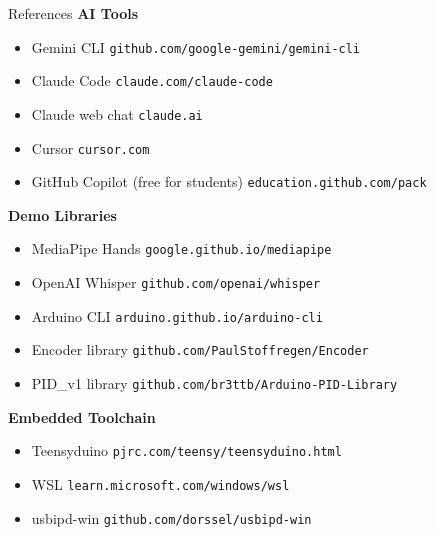 \documentclass[aspectratio=169,11pt]{beamer}
\begin{document}
\appendix

\begin{frame}[allowframebreaks]{References}
  \footnotesize
  \textbf{AI Tools}
  \begin{itemize}
    \item Gemini CLI \hfill \texttt{github.com/google-gemini/gemini-cli}
    \item Claude Code \hfill \texttt{claude.com/claude-code}
    \item Claude web chat \hfill \texttt{claude.ai}
    \item Cursor \hfill \texttt{cursor.com}
    \item GitHub Copilot (free for students) \hfill \texttt{education.github.com/pack}
  \end{itemize}
  \medskip
  \textbf{Demo Libraries}
  \begin{itemize}
    \item MediaPipe Hands \hfill \texttt{google.github.io/mediapipe}
    \item OpenAI Whisper \hfill \texttt{github.com/openai/whisper}
    \item Arduino CLI \hfill \texttt{arduino.github.io/arduino-cli}
    \item Encoder library \hfill \texttt{github.com/PaulStoffregen/Encoder}
    \item PID\_v1 library \hfill \texttt{github.com/br3ttb/Arduino-PID-Library}
  \end{itemize}
  \medskip
  \textbf{Embedded Toolchain}
  \begin{itemize}
    \item Teensyduino \hfill \texttt{pjrc.com/teensy/teensyduino.html}
    \item WSL \hfill \texttt{learn.microsoft.com/windows/wsl}
    \item usbipd-win \hfill \texttt{github.com/dorssel/usbipd-win}
  \end{itemize}
\end{frame}
\end{document}
